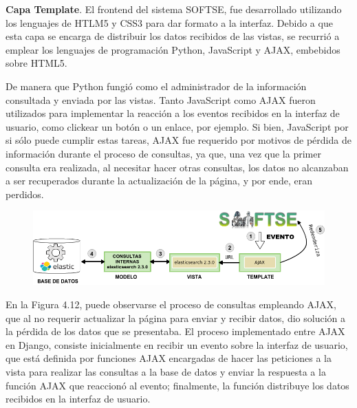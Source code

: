 \textbf{Capa Template}.
El frontend del sistema SOFTSE, fue desarrollado utilizando los lenguajes de HTLM5 y CSS3 para dar formato a la interfaz. Debido a que esta capa se encarga de distribuir los datos recibidos de las vistas, se recurrió a emplear los lenguajes de programación Python, JavaScript y AJAX, embebidos sobre HTML5. 

De manera que Python fungió como el administrador de la información consultada y enviada por las vistas. Tanto JavaScript como AJAX fueron utilizados para implementar la reacción a los eventos recibidos en la interfaz de usuario, como clickear un botón o un enlace, por ejemplo. Si bien, JavaScript por si sólo puede cumplir estas tareas, AJAX fue requerido por motivos de pérdida de información durante el proceso de consultas, ya que, una vez que la primer consulta era realizada, al necesitar hacer otras consultas, los datos no alcanzaban a ser recuperados durante la actualización de la página, y por ende, eran perdidos. 

\begin{figure}[H]
	\centering
	\includegraphics[height=0.17\textheight]{fig01/proceso_ajax}
	\label{fig:RHP02}
\end{figure}

En la Figura 4.12, puede observarse el proceso de consultas empleando AJAX, que al no requerir actualizar la página para enviar y recibir datos, dio solución a la pérdida de los datos que se presentaba. El proceso implementado entre AJAX en Django, consiste inicialmente en recibir un evento sobre la interfaz de usuario, que está definida por funciones AJAX encargadas de hacer las peticiones a la vista para realizar las consultas a la base de datos y enviar la respuesta a la función AJAX que reaccionó al evento; finalmente, la función distribuye los datos recibidos en la interfaz de usuario.

 
%
%
%


